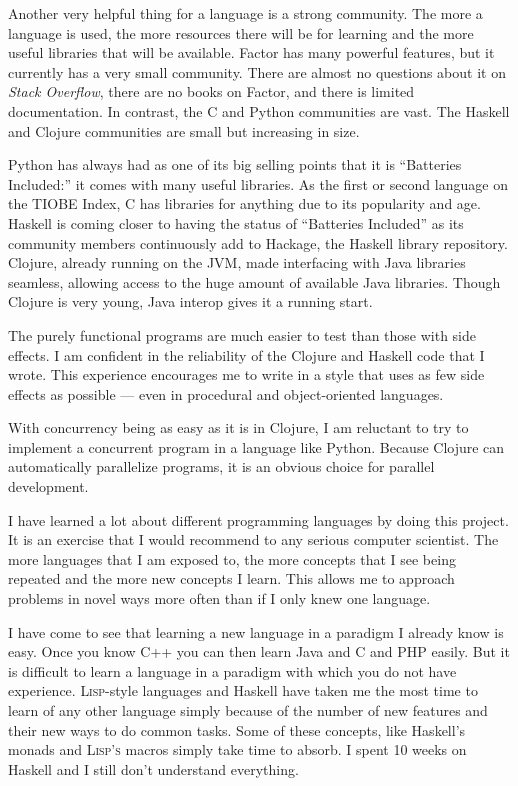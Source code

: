 \documentclass{article}
\begin{document}
Another very helpful thing for a language is a strong community.  The more a
language is used, the more resources there will be for learning and the more
useful libraries that will be available.  Factor has many powerful features, but
it currently has a very small community.  There are almost no questions about it on
\emph{Stack Overflow}, there are no books on Factor, and there is limited
documentation.  In contrast, the C and Python communities are vast.  The Haskell
and Clojure communities are small but increasing in size.

Python has always had as one of its big selling points that it is ``Batteries
Included:'' it comes with many useful libraries.  As the first or second
language on the TIOBE Index, C has libraries for anything due to its popularity
and age.  Haskell is coming closer to having the status of ``Batteries
Included'' as its community members continuously add to Hackage, the Haskell
library repository.  Clojure, already running on the JVM, made interfacing with
Java libraries seamless, allowing access to the huge amount of available Java
libraries.  Though Clojure is very young, Java interop gives it a running
start.

The purely functional programs are much easier to test than those with side
effects.  I am confident in the reliability of the Clojure and Haskell code that
I wrote.  This experience encourages me to write in a style that uses as few
side effects as possible --- even in procedural and object-oriented languages.  

With concurrency being as easy as it is in Clojure, I am reluctant to try to
implement a concurrent program in a language like Python.  Because Clojure can
automatically parallelize programs, it is an obvious choice for parallel
development.

I have learned a lot about different programming languages by doing this
project.  It is an exercise that I would recommend to any serious computer
scientist.  The more languages that I am exposed to, the more concepts that I
see being repeated and the more new concepts I learn.  This allows me to
approach problems in novel ways more often than if I only knew one language.

I have come to see that learning a new language in a paradigm I already know is
easy.  Once you know C++ you can then learn Java and C and PHP easily.  But it
is difficult to learn a language in a paradigm with which you do not have
experience.  \textsc{Lisp}-style languages and Haskell have taken me the most
time to learn of any other language simply because of the number of new features
and their new ways to do common tasks.  Some of these concepts, like Haskell's
monads and \textsc{Lisp's} macros simply take time to absorb.  I spent 10 weeks
on Haskell and I still don't understand everything.
\end{document}
